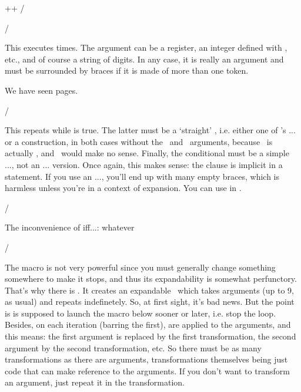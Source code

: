 \Example
{}
+\foo+
\Example/

\description/








This executes   times. The 
argument can be a \com\count register, an integer defined with
\com\chardef, etc., and of course a string of digits. In any case,
it is really an argument and must be surrounded by braces if it is
made of more than one token.

\Example
We have seen \repeatuntil{} pages.\par
\edef\foo{}
\meaning\foo
\Example/


This repeats  while  is true. The latter
must be a `straight' , i.e. either one of \texapi's
\com\if... or a \com\straightenif{} construction,
in both cases without the \true\ and \false\ arguments, because \true\ is actually
, and \false\ would make no sense. Finally, the conditional
must be a simple \com\if..., not an \com\iff... version. Once again, this
makes sense: the  clause is implicit in a 
statement. If you use an \com\iff..., you'll end up with many empty braces,
which is harmless unless you're in a context of expansion. You can use \com\reverse
in .

\Example
\newife\ifbreakloop \def\foo{}
\dowhile{\reverse\ifbreakloop}
        {\addleft\foo{a}%
         \passexpanded\iffstring\foo{aaaa}
                      \breaklooptrue}
\foo
\Example/

\Example
\edef\foo{%
  The inconvenience of iff...:
          {whatever}
  }
\meaning\foo
\Example/



The \com\dowhile macro is not very powerful since
you must generally change something somewhere to make
it stops, and thus its expandability is somewhat perfunctory.
That's why there is \com\newwhile. It creates an expandable \comarg\ which takes
 arguments (up to 9, as usual) and repeats 
indefinetely. So, at first sight, it's bad news. But the point
is  is supposed to launch the \com\breakwhile macro below sooner or
later, i.e. stop the loop. Besides, on each iteration (barring the first), 
are applied to the arguments, and this means: the first argument is
replaced by the first transformation, the second argument by the second
transformation, etc. So there must be as many transformations as there
are arguments, transformations themselves being just code that can
make reference to the arguments. If you don't want to transform an
argument, just repeat it in the transformation.


